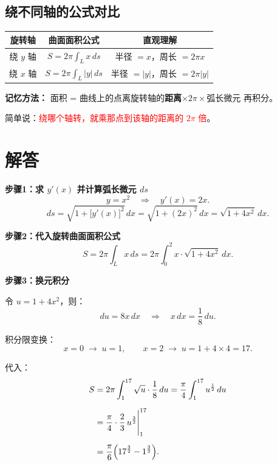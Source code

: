 \documentclass[12pt,a4paper]{ctexart}
\begin{document}
\subsection*{绕不同轴的公式对比}

\begin{center}
\renewcommand{\arraystretch}{1.8}
\begin{tabular}{|c|c|c|}
  \hline
  \textbf{旋转轴} & \textbf{曲面面积公式} & \textbf{直观理解} \\
  \hline
  绕 $y$ 轴 & $S = 2\pi \displaystyle\int_L x\, ds$ & 半径 $= x$，周长 $=2\pi x$ \\
  \hline
  绕 $x$ 轴 & $S = 2\pi \displaystyle\int_L |y|\, ds$ & 半径 $= |y|$，周长 $=2\pi|y|$ \\
  \hline
\end{tabular}
\end{center}

\textbf{记忆方法：} 面积 = 曲线上的点离旋转轴的\textbf{距离}$\times 2\pi\times$弧长微元 再积分。

简单说：\textcolor{red}{绕哪个轴转，就乘那点到该轴的距离的 $2\pi$ 倍}。

\section*{解答}

\noindent\textbf{步骤1：求 $y'(x)$ 并计算弧长微元 $ds$}
\[
y = x^2 \quad\Longrightarrow\quad y'(x) = 2x.
\]
\[
ds = \sqrt{1 + \bigl[y'(x)\bigr]^2}\, dx
    = \sqrt{1 + (2x)^2}\, dx
    = \sqrt{1 + 4x^2}\, dx.
\]

\medskip

\noindent\textbf{步骤2：代入旋转曲面面积公式}
\[
S = 2\pi \int_L x\, ds
   = 2\pi \int_0^2 x \cdot \sqrt{1 + 4x^2}\, dx.
\]

\medskip

\noindent\textbf{步骤3：换元积分}

令 $u = 1 + 4x^2$，则：
\[
du = 8x\, dx \quad\Longrightarrow\quad x\, dx = \frac{1}{8}\, du.
\]

积分限变换：
\[
x = 0 \;\to\; u = 1,\qquad
x = 2 \;\to\; u = 1 + 4 \times 4 = 17.
\]

代入：
\[
\begin{aligned}
S &= 2\pi \int_1^{17} \sqrt{u} \cdot \frac{1}{8}\, du
    = \frac{\pi}{4} \int_1^{17} u^{\frac{1}{2}}\, du \\[6pt]
  &= \frac{\pi}{4} \cdot \frac{2}{3}\, u^{\frac{3}{2}} \Biggr|_1^{17} \\[6pt]
  &= \frac{\pi}{6} \Bigl( 17^{\frac{3}{2}} - 1^{\frac{3}{2}} \Bigr).
\end{aligned}
\]
\end{document}
